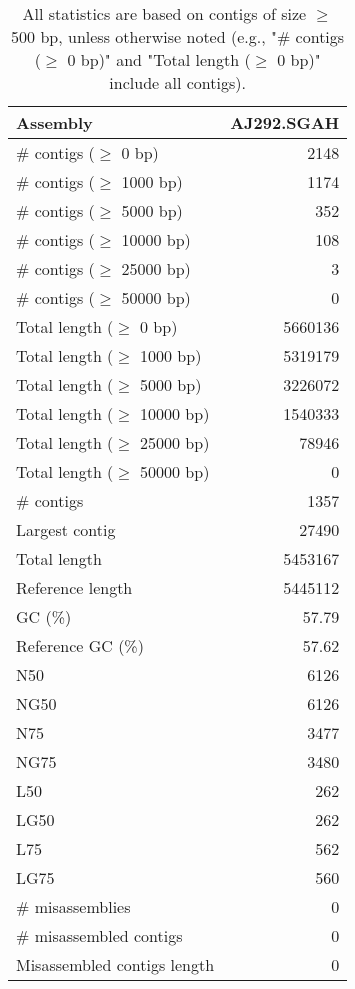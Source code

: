 \documentclass[12pt,a4paper]{article}
\begin{document}
\begin{table}[ht]
\begin{center}
\caption{All statistics are based on contigs of size $\geq$ 500 bp, unless otherwise noted (e.g., "\# contigs ($\geq$ 0 bp)" and "Total length ($\geq$ 0 bp)" include all contigs).}
\begin{tabular}{|l*{1}{|r}|}
\hline
Assembly & AJ292.SGAH \\ \hline
\# contigs ($\geq$ 0 bp) & 2148 \\ \hline
\# contigs ($\geq$ 1000 bp) & 1174 \\ \hline
\# contigs ($\geq$ 5000 bp) & 352 \\ \hline
\# contigs ($\geq$ 10000 bp) & 108 \\ \hline
\# contigs ($\geq$ 25000 bp) & 3 \\ \hline
\# contigs ($\geq$ 50000 bp) & 0 \\ \hline
Total length ($\geq$ 0 bp) & 5660136 \\ \hline
Total length ($\geq$ 1000 bp) & 5319179 \\ \hline
Total length ($\geq$ 5000 bp) & 3226072 \\ \hline
Total length ($\geq$ 10000 bp) & 1540333 \\ \hline
Total length ($\geq$ 25000 bp) & 78946 \\ \hline
Total length ($\geq$ 50000 bp) & 0 \\ \hline
\# contigs & 1357 \\ \hline
Largest contig & 27490 \\ \hline
Total length & 5453167 \\ \hline
Reference length & 5445112 \\ \hline
GC (\%) & 57.79 \\ \hline
Reference GC (\%) & 57.62 \\ \hline
N50 & 6126 \\ \hline
NG50 & 6126 \\ \hline
N75 & 3477 \\ \hline
NG75 & 3480 \\ \hline
L50 & 262 \\ \hline
LG50 & 262 \\ \hline
L75 & 562 \\ \hline
LG75 & 560 \\ \hline
\# misassemblies & 0 \\ \hline
\# misassembled contigs & 0 \\ \hline
Misassembled contigs length & 0 \\ \hline

\end{tabular}
\end{center}
\end{table}
\end{document}
